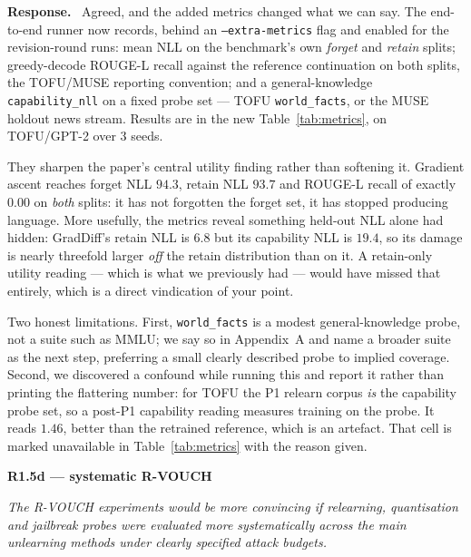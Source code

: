 \documentclass[11pt,a4paper]{article}
\newenvironment{point}[1]{%
  \par\medskip\noindent\textbf{\color{rcol}#1}\par\nopagebreak\smallskip\begingroup
  \color{rcol}\itshape}{\endgroup\par}
\newenvironment{reply}{%
  \par\smallskip\noindent\textbf{\color{acol}Response.}\ \begingroup}{\endgroup\par}
\begin{document}
\begin{reply}
Agreed, and the added metrics changed what we can say. The end-to-end runner now
records, behind an \texttt{--extra-metrics} flag and enabled for the revision-round
runs: mean NLL on the benchmark's own \emph{forget} and \emph{retain} splits;
greedy-decode ROUGE-L recall against the reference continuation on both splits, the
TOFU/MUSE reporting convention; and a general-knowledge \texttt{capability\_nll} on a
fixed probe set --- TOFU \texttt{world\_facts}, or the MUSE holdout news stream.
Results are in the new Table~\ref{tab:metrics}, on TOFU/GPT-2 over $3$ seeds.

They sharpen the paper's central utility finding rather than softening it. Gradient
ascent reaches forget NLL $94.3$, retain NLL $93.7$ and ROUGE-L recall of exactly
$0.00$ on \emph{both} splits: it has not forgotten the forget set, it has stopped
producing language. More usefully, the metrics reveal something held-out NLL alone had
hidden: GradDiff's retain NLL is $6.8$ but its capability NLL is $19.4$, so its damage
is nearly threefold larger \emph{off} the retain distribution than on it. A
retain-only utility reading --- which is what we previously had --- would have missed
that entirely, which is a direct vindication of your point.

Two honest limitations. First, \texttt{world\_facts} is a modest general-knowledge
probe, not a suite such as MMLU; we say so in Appendix~A and name a broader suite as
the next step, preferring a small clearly described probe to implied coverage. Second,
we discovered a confound while running this and report it rather than printing the
flattering number: for TOFU the P1 relearn corpus \emph{is} the capability probe set,
so a post-P1 capability reading measures training on the probe. It reads $1.46$,
better than the retrained reference, which is an artefact. That cell is marked
unavailable in Table~\ref{tab:metrics} with the reason given.
\end{reply}

\begin{point}{R1.5d --- systematic R-VOUCH}
The R-VOUCH experiments would be more convincing if relearning, quantisation and
jailbreak probes were evaluated more systematically across the main unlearning methods
under clearly specified attack budgets.
\end{point}
\end{document}
